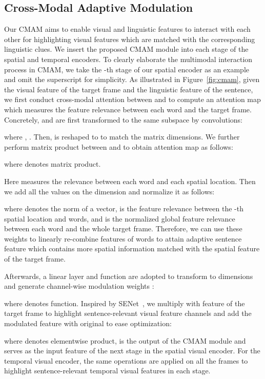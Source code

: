 \documentclass[final]{cvpr}
\begin{document}
\subsection{Cross-Modal Adaptive Modulation}
Our CMAM aims to enable visual and linguistic features to interact with each other for highlighting visual features which are matched with the corresponding linguistic clues. 
We insert the proposed CMAM module into each stage of the spatial and temporal encoders. 
To clearly elaborate the multimodal interaction process in CMAM, we take the -th stage of our spatial encoder as an example and omit the superscript  for simplicity. 
As illustrated in Figure~\ref{fig:cmam}, given the visual feature  of the target frame and the linguistic feature  of the sentence, we first conduct cross-modal attention between  and  to compute an attention map  which measures the feature relevance between each word and the target frame. 
Concretely,  and  are first transformed to the same subspace by convolutions:


where , . 
Then,  is reshaped to  to match the matrix dimensions. 
We further perform matrix product between  and  to obtain attention map  as follows:

where  denotes matrix product.

Here  measures the relevance between each word and each spatial location. Then we add all the values on the  dimension and normalize it as follows:

where  denotes the  norm of a vector,  is the feature relevance between the -th spatial location and  words, and  is the normalized global feature relevance between each word and the whole target frame. 
Therefore, we can use these  weights to linearly re-combine features of  words to attain adaptive sentence feature  which contains more spatial information matched with the spatial feature  of the target frame. 

Afterwards, a linear layer and  function are adopted to transform  to  dimensions and generate channel-wise modulation weights :

where  denotes  function. 
Inspired by SENet~\cite{hu2018squeeze}, we multiply  with feature of the target frame  to highlight sentence-relevant visual feature channels and add the modulated feature with original  to ease optimization:

where  denotes elementwise product,  is the output of the CMAM module and serves as the input feature of the next stage in the spatial visual encoder. 
For the temporal visual encoder, the same operations are applied on all the  frames to highlight sentence-relevant temporal visual features in each stage. 
\end{document}
